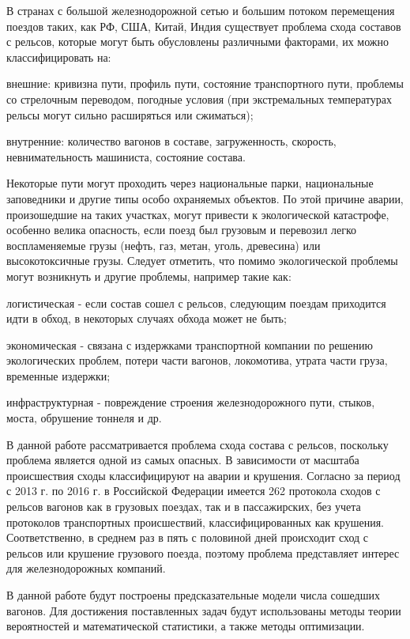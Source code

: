 В странах с большой железнодорожной сетью и большим потоком перемещения поездов таких, как РФ, США, Китай, Индия существует проблема схода составов с рельсов, которые могут быть обусловлены различными факторами, их можно классифицировать на:

\begin{description}[font=$\bullet$]
\item внешние: кривизна пути, профиль пути, состояние транспортного пути, проблемы со стрелочным переводом, погодные условия (при экстремальных температурах рельсы могут сильно расширяться или сжиматься);
    
\item внутренние: количество вагонов в составе, загруженность, скорость, невнимательность машиниста, состояние состава.
\end{description}
Некоторые пути могут проходить через национальные парки, национальные заповедники и другие типы особо охраняемых объектов. По этой причине аварии, произошедшие на таких участках, могут привести к экологической катастрофе, особенно велика опасность, если поезд был грузовым и перевозил легко воспламеняемые грузы (нефть, газ, метан, уголь, древесина) или высокотоксичные грузы. Следует отметить, что помимо экологической проблемы могут возникнуть и другие проблемы, например такие как:

\begin{description}[font=$\bullet$]
\item логистическая - если состав сошел с рельсов, следующим поездам приходится идти в обход, в некоторых случаях обхода может не быть;
\item экономическая - связана с издержками транспортной компании по решению экологических проблем, потери части вагонов, локомотива, утрата части груза, временные издержки;
\item инфраструктурная - повреждение строения железнодорожного пути, стыков, моста, обрушение тоннеля и др.
\end{description}
В данной работе рассматривается проблема схода состава с рельсов, поскольку проблема является одной из самых опасных. В зависимости от масштаба происшествия сходы классифицируют на аварии и крушения. Согласно \cite{Ignatov:functional_dependence} за период с 2013 г. по 2016 г. в Российской Федерации имеется 262 протокола сходов с рельсов вагонов как в грузовых поездах, так и в пассажирских, без учета протоколов транспортных происшествий, классифицированных как крушения. Соответственно, в среднем раз в пять с половиной дней происходит сход с рельсов или крушение грузового поезда, поэтому проблема представляет интерес для железнодорожных компаний.

В данной работе будут построены предсказательные модели числа сошедших вагонов. Для достижения поставленных задач будут использованы методы теории вероятностей и математической статистики, а также методы оптимизации.

